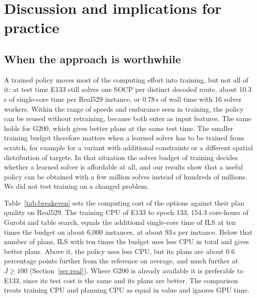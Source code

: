 \documentclass[preprint,12pt,authoryear]{elsarticle}
\begin{document}
\section{Discussion and implications for practice}
\label{sec:discussion}

\subsection{When the approach is worthwhile}

A trained policy moves most of the computing effort into training, but not all of it: at test time E133 still solves one SOCP per distinct decoded route, about 10.3\,s of single-core time per Real529 instance, or 0.78\,s of wall time with 16 solver workers. Within the range of speeds and endurance seen in training, the policy can be reused without retraining, because both enter as input features. The same holds for G200, which gives better plans at the same test time. The smaller training budget therefore matters when a learned solver has to be trained from scratch, for example for a variant with additional constraints or a different spatial distribution of targets. In that situation the solver budget of training decides whether a learned solver is affordable at all, and our results show that a useful policy can be obtained with a few million solves instead of hundreds of millions. We did not test training on a changed problem.

Table~\ref{tab:breakeven} sets the computing cost of the options against their plan quality on Real529. The training CPU of E133 to epoch 133, 154.3 core-hours of Gurobi and table search, equals the additional single-core time of ILS at ten times the budget on about 6,000 instances, at about 93\,s per instance. Below that number of plans, ILS with ten times the budget uses less CPU in total and gives better plans. Above it, the policy uses less CPU, but its plans are about 0.6 percentage points further from the reference on average, and much further at $J \ge 100$ (Section~\ref{sec:real}). Where G200 is already available it is preferable to E133, since its test cost is the same and its plans are better. The comparison treats training CPU and planning CPU as equal in value and ignores GPU time.
\end{document}
